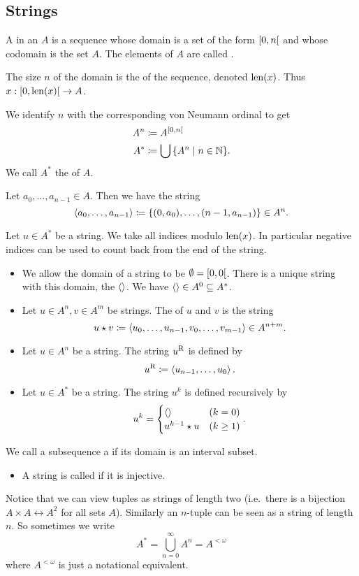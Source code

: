 \subsection{Strings}
\begin{definition}
A  in an  $A$ is a sequence whose domain is a set of the form $\interval[co]{0,n}$ and whose codomain is the set $A$. The elements of $A$ are called .

The size $n$ of the domain is the  of the sequence, denoted $\operatorname{len}(x)$. Thus $x: \interval[co]{0,\len(x)}\to A$.


We identify $n$ with the corresponding von Neumann ordinal to get
\begin{align*}
A^{n} &\defeq A^{\interval[co]{0,n}} \\
A^* &\defeq \bigcup\setbuilder{ A^{n}}{n\in \N}.
\end{align*}
We call $A^*$ the  of $A$.

Let $a_0,\ldots, a_{n-1}\in A$. Then we have the string
\[ \left\langle a_0,\ldots, a_{n-1} \right\rangle \coloneqq \{(0,a_0),\ldots, (n-1,a_{n-1})\} \in A^{n}. \]

Let $u\in A^*$ be a string. We take all indices modulo $\operatorname{len}(x)$. In particular negative indices can be used to count back from the end of the string.

\begin{itemize}
\item We allow the domain of a string to be $\emptyset = \interval[co]{0,0}$. There is a unique string with this domain, the  $\left\langle  \right\rangle$. We have $\left\langle  \right\rangle\in A^0 \subseteq A^*$.
\item Let $u\in A^{n}, v\in A^{m}$ be strings. The  of $u$ and $v$ is the string
\[ u\star v \coloneqq \left\langle u_0,\ldots, u_{n-1},v_0,\ldots, v_{m-1} \right\rangle \in A^{n+m}. \]
\item Let $u\in A^{n}$ be a string. The  string ${u}^\mathrm{R}$ is defined by
\[ {u}^\mathrm{R} \coloneqq \left\langle u_{n-1}, \ldots, u_0 \right\rangle. \]
\item Let $u\in A^*$ be a string. The string $u^k$ is defined recursively by
\[ u^{k} = \begin{cases}
\left\langle  \right\rangle & (k=0) \\
u^{k-1}\star u & (k\geq 1)
\end{cases}. \]
\end{itemize}
We call a subsequence a  if its domain is an interval subset.
\begin{itemize}
\item A string is called  if it is injective.
\end{itemize}
\end{definition}
Notice that we can view tuples as strings of length two (i.e.\ there is a bijection $A\times A \leftrightarrow A^{2}$ for all sets $A$). Similarly an $n$-tuple can be seen as a string of length $n$. So sometimes we write
\[ A^* = \bigcup^\infty_{n=0}A^n = A^{<\omega}\]
where $A^{<\omega}$ is just a notational equivalent.

